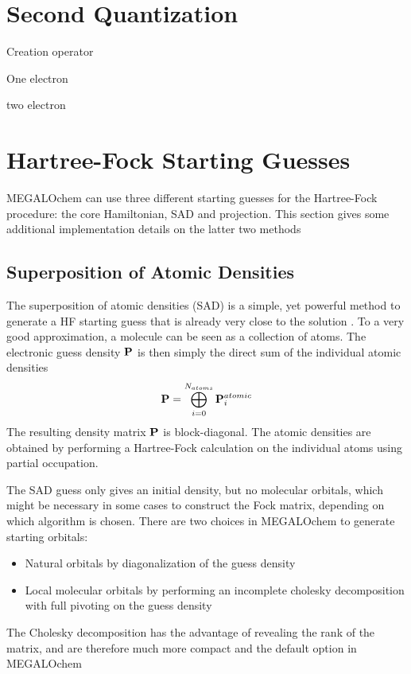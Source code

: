 \appendix
\chapter{Second Quantization}

Creation operator

One electron

two electron

\chapter{Hartree-Fock Starting Guesses \label{sec:SCFGUESS}}

MEGALOchem can use three different starting guesses for the Hartree-Fock procedure: the core Hamiltonian, SAD and projection. This section gives some additional implementation details on the latter two methods

\section{Superposition of Atomic Densities}

The superposition of atomic densities (SAD) is a simple, yet powerful method to generate a HF starting guess that is already very close to the solution \cite{Van2006,Leh2019}. To a very good approximation, a molecule can be seen as a collection of atoms. The electronic guess density $\mathbf{P}$ is then simply the direct sum of the individual atomic densities 
\begin{equation}
\mathbf{P} = \bigoplus_{i=0}^{N_{atoms}} \mathbf{P}^{atomic}_i 
\end{equation}
\noindent The resulting density matrix $\mathbf{P}$ is block-diagonal. The atomic densities are obtained by performing a Hartree-Fock calculation on the individual atoms using partial occupation.

The SAD guess only gives an initial density, but no molecular orbitals, which might be necessary in some cases to construct the Fock matrix, depending on which algorithm is chosen. There are two choices in MEGALOchem to generate starting orbitals:
\begin{itemize}
\item Natural orbitals by diagonalization of the guess density
\item Local molecular orbitals by performing an incomplete cholesky decomposition with full pivoting on the guess density
\end{itemize}
The Cholesky decomposition has the advantage of revealing the rank of the matrix, and are therefore much more compact and the default option in MEGALOchem

